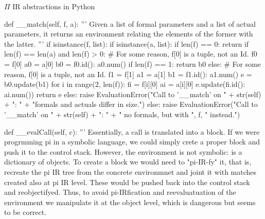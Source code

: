 \documentclass{beamer}
\begin{document}
\begin{frame}{{\color{red}$\Pi$ IR} abstractions in Python}
\begin{python}
    def __match(self, f, a):
        '''
        Given a list of formal parameters and a list of actual parameters,
        it returns an environment relating the elements of the former with the latter.
        '''
        if isinstance(f, list):
            if isinstance(a, list):
                if len(f) == 0:
                    return {}
                if len(f) == len(a) and len(f) > 0:
                # For some reason, f[0] is a tuple, not an Id.
                    f0 = f[0]
                    a0 = a[0]
                    b0 = {f0.id(): a0.num()}
                if len(f) == 1:
                    return b0
                else:
                    # For some reason, f[0] is a tuple, not an Id.
                    f1 = f[1]
                    a1 = a[1]
                    b1 = {f1.id(): a1.num()}
                    e = b0.update(b1)
                    for i in range(2, len(f)):
                        fi = f[i][0]
                        ai = a[i][0]
                        e.update({fi.id(): ai.num()})
                    return e
            else:
                raise EvaluationError("Call to '__match' on " + str(self) + ": " + "formals and actuals differ in size.")
        else:
            raise EvaluationError("Call to '__match' on " + str(self) + ": " + " no formals, but with ", f, " instead.")

    def __evalCall(self, c):
        '''
        Essentially, a call is translated into a block.
        If we were progrmming pi in a symbolic language,
        we could simply crete a proper block and push it to the control stack.
        However, the environment is not symbolic: is a dictionary of objects.
        To create a block we would need to "pi-IR-fy" it, that is, recreate the
        pi IR tree from the concrete environmnet and joint it with matches created
        also at pi IR level. These would be pushed back into the control stack and
        reobjectifyed. Thus, to avoid pi-IRfication and reevaluatuation of the
        environment we manipulate it at the object level, which is dangerous but
        seems to be correct.
        

\end{python}
\end{frame}
\end{document}
